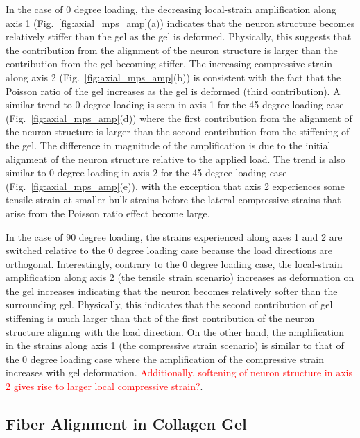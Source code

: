 \documentclass[10pt]{asme2ej}
\begin{document}
In the case of 0 degree loading, the decreasing local-strain amplification along axis 1 (Fig.\ \ref{fig:axial_mps_amp}(a)) indicates that the neuron structure becomes relatively stiffer than the gel as the gel is deformed. Physically, this suggests that the contribution from the alignment of the neuron structure is larger than the contribution from the gel becoming stiffer. The increasing compressive strain along axis 2 (Fig.\ \ref{fig:axial_mps_amp}(b)) is consistent with the fact that the Poisson ratio of the gel increases as the gel is deformed (third contribution). A similar trend to 0 degree loading is seen in axis 1 for the 45 degree loading case (Fig.\ \ref{fig:axial_mps_amp}(d)) where the first contribution from the alignment of the neuron structure is larger than the second contribution from the stiffening of the gel. The difference in magnitude of the amplification is due to the initial alignment of the neuron structure relative to the applied load. The trend is also similar to 0 degree loading in axis 2 for the 45 degree loading case (Fig.\ \ref{fig:axial_mps_amp}(e)), with the exception that axis 2 experiences some tensile strain at smaller bulk strains before the lateral compressive strains that arise from the Poisson ratio effect become large.

In the case of 90 degree loading, the strains experienced along axes 1 and 2 are switched relative to the 0 degree loading case because the load directions are orthogonal. Interestingly, contrary to the 0 degree loading case, the local-strain amplification along axis 2 (the tensile strain scenario) increases as deformation on the gel increases indicating that the neuron becomes relatively softer than the surrounding gel. Physically, this indicates that the second contribution of gel stiffening is much larger than that of the first contribution of the neuron structure aligning with the load direction. On the other hand, the amplification in the strains along axis 1 (the compressive strain scenario) is similar to that of the 0 degree loading case where the amplification of the compressive strain increases with gel deformation. \textcolor{red}{Additionally, softening of neuron structure in axis 2 gives rise to larger local compressive strain?}.

\subsection{Fiber Alignment in Collagen Gel}
\end{document}
